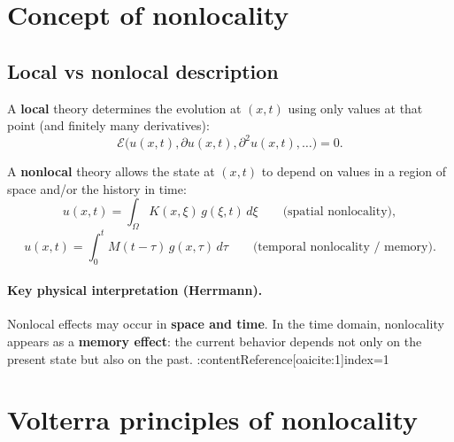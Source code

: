 
\section{Concept of nonlocality}

\subsection{Local vs nonlocal description}
A \textbf{local} theory determines the evolution at $(x,t)$ using only values at that point
(and finitely many derivatives):
\begin{equation}
\mathcal{E}\big(u(x,t),\partial u(x,t),\partial^2 u(x,t),\dots\big)=0.
\end{equation}

A \textbf{nonlocal} theory allows the state at $(x,t)$ to depend on values in a region
of space and/or the history in time:
\begin{equation}
u(x,t) = \int_{\Omega}K(x,\xi)\,g(\xi,t)\,d\xi
\qquad \text{(spatial nonlocality)},
\end{equation}
\begin{equation}
u(x,t) = \int_0^t M(t-\tau)\,g(x,\tau)\,d\tau
\qquad \text{(temporal nonlocality / memory)}.
\end{equation}

\paragraph{Key physical interpretation (Herrmann).}
Nonlocal effects may occur in \textbf{space and time}. In the time domain, nonlocality
appears as a \textbf{memory effect}: the current behavior depends not only on the present
state but also on the past. :contentReference[oaicite:1]{index=1}


\section{Volterra principles of nonlocality}

